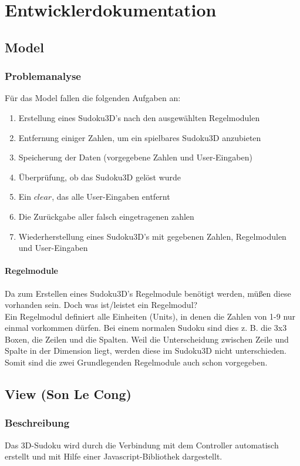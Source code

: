 \documentclass[a4paper,12pt]{scrreprt}
\begin{document}
	\chapter{Entwicklerdokumentation}
	\section{Model}
	\subsection{Problemanalyse}
	F\"ur das Model fallen die folgenden Aufgaben an:
	\begin{enumerate}
		\item Erstellung eines Sudoku3D's nach den ausgew\"ahlten Regelmodulen
		\item Entfernung einiger Zahlen, um ein spielbares Sudoku3D anzubieten
		\item Speicherung der Daten (vorgegebene Zahlen und User-Eingaben)
		\item \"Uberpr\"ufung, ob das Sudoku3D gel\"ost wurde
		\item Ein $clear$, das alle User-Eingaben entfernt
		\item Die Zur\"uckgabe aller falsch eingetragenen zahlen
		\item Wiederherstellung eines Sudoku3D's mit gegebenen Zahlen, Regelmodulen und
			User-Eingaben
	\end{enumerate}

	\subsubsection{Regelmodule}
	Da zum Erstellen eines Sudoku3D's Regelmodule ben\"otigt werden, m\"u{\ss}en diese vorhanden
	sein. Doch was ist/leistet ein Regelmodul?\medskip \\
	Ein Regelmodul definiert alle Einheiten (Units), in denen die Zahlen von 1-9 nur einmal vorkommen
	d\"urfen. Bei einem normalen Sudoku sind dies z. B. die 3x3 Boxen, die Zeilen und die Spalten.
	Weil die Unterscheidung zwischen Zeile und Spalte in der Dimension liegt, werden diese im
	Sudoku3D nicht unterschieden. Somit sind die zwei Grundlegenden Regelmodule auch schon
	vorgegeben.

	\section{View (Son Le Cong)}
	\subsection{Beschreibung}
	Das 3D-Sudoku wird durch die Verbindung mit dem Controller automatisch erstellt und mit Hilfe
	einer Javascript-Bibliothek dargestellt.
\end{document}
